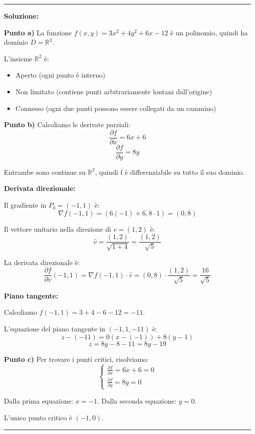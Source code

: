 \documentclass[12pt, a4paper]{article}
\newenvironment{solution}
{\par\noindent\rule{\textwidth}{0.4pt}\par\textbf{Soluzione:}\medskip\par}
{\par\rule{\textwidth}{0.4pt}\par\bigskip}
\begin{document}
\begin{solution}
\textbf{Punto a)} La funzione $f(x,y) = 3x^{2} + 4y^{2} + 6x - 12$ è un polinomio, quindi ha dominio $D = \mathbb{R}^2$.

L'insieme $\mathbb{R}^2$ è:
\begin{itemize}
    \item Aperto (ogni punto è interno)
    \item Non limitato (contiene punti arbitrariamente lontani dall'origine)
    \item Connesso (ogni due punti possono essere collegati da un cammino)
\end{itemize}

\vspace{0.5cm}

\textbf{Punto b)} Calcoliamo le derivate parziali:
\[
\frac{\partial f}{\partial x} = 6x + 6
\]
\[
\frac{\partial f}{\partial y} = 8y
\]

Entrambe sono continue su $\mathbb{R}^2$, quindi f è differenziabile su tutto il suo dominio.

\textbf{Derivata direzionale:}

Il gradiente in $P_0 = (-1,1)$ è:
\[
\nabla f(-1,1) = (6(-1) + 6, 8 \cdot 1) = (0, 8)
\]

Il vettore unitario nella direzione di $v = (1,2)$ è:
\[
\hat{v} = \frac{(1,2)}{\sqrt{1+4}} = \frac{(1,2)}{\sqrt{5}}
\]

La derivata direzionale è:
\[
\frac{\partial f}{\partial v}(-1,1) = \nabla f(-1,1) \cdot \hat{v} = (0,8) \cdot \frac{(1,2)}{\sqrt{5}} = \frac{16}{\sqrt{5}}
\]

\textbf{Piano tangente:}

Calcoliamo $f(-1,1) = 3 + 4 - 6 - 12 = -11$.

L'equazione del piano tangente in $(-1,1,-11)$ è:
\[
z - (-11) = 0(x - (-1)) + 8(y - 1)
\]
\[
z = 8y - 8 - 11 = 8y - 19
\]

\vspace{0.5cm}

\textbf{Punto c)} Per trovare i punti critici, risolviamo:
\[
\begin{cases}
\frac{\partial f}{\partial x} = 6x + 6 = 0 \\
\frac{\partial f}{\partial y} = 8y = 0
\end{cases}
\]

Dalla prima equazione: $x = -1$.
Dalla seconda equazione: $y = 0$.

L'unico punto critico è $(-1, 0)$.


\end{solution}
\end{document}
